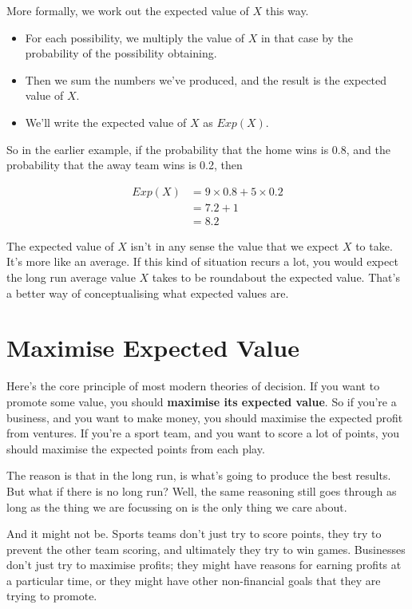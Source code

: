\documentclass[11pt,]{article}
\providecommand{\tightlist}{%
  \setlength{\itemsep}{0pt}\setlength{\parskip}{0pt}}
\begin{document}
More formally, we work out the expected value of \(X\) this way.

\begin{itemize}
\tightlist
\item
  For each possibility, we multiply the value of \(X\) in that case by
  the probability of the possibility obtaining.
\item
  Then we sum the numbers we've produced, and the result is the expected
  value of \(X\).
\item
  We'll write the expected value of \(X\) as \(Exp(X)\).
\end{itemize}

So in the earlier example, if the probability that the home wins is 0.8,
and the probability that the away team wins is 0.2, then

\begin{align*}
Exp(X) &= 9 \times 0.8 + 5 \times 0.2 \\
 &= 7.2 + 1 \\
 &= 8.2
\end{align*}

The expected value of \(X\) isn't in any sense the value that we expect
\(X\) to take. It's more like an average. If this kind of situation
recurs a lot, you would expect the long run average value \(X\) takes to
be roundabout the expected value. That's a better way of conceptualising
what expected values are.

\hypertarget{maximise-expected-value}{%
\section{Maximise Expected Value}\label{maximise-expected-value}}

Here's the core principle of most modern theories of decision. If you
want to promote some value, you should \textbf{maximise its expected
value}. So if you're a business, and you want to make money, you should
maximise the expected profit from ventures. If you're a sport team, and
you want to score a lot of points, you should maximise the expected
points from each play.

The reason is that in the long run, is what's going to produce the best
results. But what if there is no long run? Well, the same reasoning
still goes through as long as the thing we are focussing on is the only
thing we care about.

And it might not be. Sports teams don't just try to score points, they
try to prevent the other team scoring, and ultimately they try to win
games. Businesses don't just try to maximise profits; they might have
reasons for earning profits at a particular time, or they might have
other non-financial goals that they are trying to promote.
\end{document}
